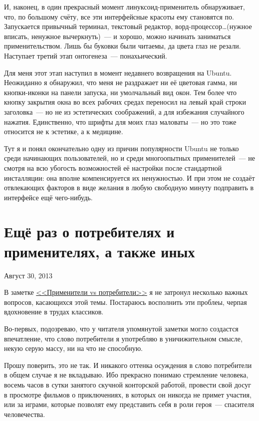 И, наконец, в один прекрасный момент линуксоид-применитель обнаруживает, что, по большому счёту, все эти интерфейсные красоты ему становятся по. Запускается привычный терминал, текстовый редактор, ворд-процессор\dots (нужное вписать, ненужное вычеркнуть)~--- и хорошо, можно начинать заниматься применительством. Лишь бы буковки были читаемы, да цвета глаз не резали. Наступает третий этап онтогенеза~--- понахьический.

Для меня этот этап наступил в момент недавнего возвращения на Ubuntu. Неожиданно  я обнаружил, что меня не раздражает ни её цветовая гамма, ни кнопки-иконки на панели запуска, ни умолчальный вид окон. Тем более что кнопку закрытия окна во всех рабочих средах переносил на левый край строки заголовка~--- но не из эстетических соображений, а для избежания случайного нажатия. Единственно, что шрифты для моих глаз маловаты~--- но это тоже относится не к эстетике, а к медицине.

Тут я и понял окончательно одну из причин популярности Ubuntu не только среди начинающих пользователей, но и среди многоопытных применителей~--- не смотря на всю убогость возможностей её настройки после стандартной инсталляции: она вполне компенсируется их ненужностью. И при этом не создаёт отвлекающих факторов в виде желания в любую свободную минуту подправить в интерфейсе ещё чего-нибудь.

\section{Ещё раз о потребителях и применителях, а также иных} 

\begin{timeline}Август 30, 2013\end{timeline}

В заметке \hyperlink{customers}{<<Применители vs потребители>>} я не затронул несколько важных вопросов, касающихся этой темы. Постараюсь восполнить эти проблеы, черпая вдохновение в трудах классиков.

Во-первых, подозреваю, что у читателя упомянутой заметки могло создастся впечатление, что слово потребители я употребляю в уничижительном смысле, некую серую массу, ни на что не способную.

Прошу поверить, это не так. И никакого оттенка осуждения в слово потребители в общем случае я не вкладываю. Ибо прекрасно понимаю стремление человека, восемь часов в сутки занятого скучной конторской работой, провести свой досуг в просмотре фильмов о приключениях, в которых он никогда не примет участия, или за играми, которые позволят ему представить себя в роли героя~--- спасителя человечества.

